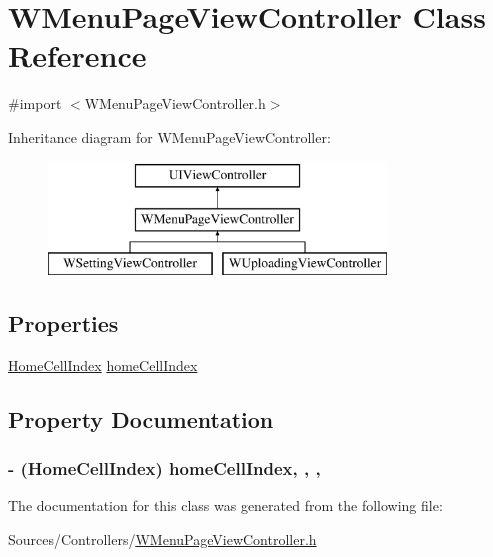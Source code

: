 \hypertarget{interface_w_menu_page_view_controller}{\section{W\-Menu\-Page\-View\-Controller Class Reference}
\label{interface_w_menu_page_view_controller}
}


{\ttfamily \#import $<$W\-Menu\-Page\-View\-Controller.\-h$>$}

Inheritance diagram for W\-Menu\-Page\-View\-Controller\-:\begin{figure}[H]
\begin{center}
\leavevmode
\includegraphics[height=3.000000cm]{interface_w_menu_page_view_controller}
\end{center}
\end{figure}
\subsection*{Properties}
\begin{DoxyCompactItemize}
\item 
\hyperlink{_w_home_view_controller_8h_af693adb781d3a9619a4217eaf2ec3905}{Home\-Cell\-Index} \hyperlink{interface_w_menu_page_view_controller_a00f0413f12d7efa190c920d4eb8cafc0}{home\-Cell\-Index}
\end{DoxyCompactItemize}


\subsection{Property Documentation}
\hypertarget{interface_w_menu_page_view_controller_a00f0413f12d7efa190c920d4eb8cafc0}{
\subsubsection[{home\-Cell\-Index}]{\setlength{\rightskip}{0pt plus 5cm}-\/ ({\bf Home\-Cell\-Index}) home\-Cell\-Index\hspace{0.3cm}{\ttfamily [read]}, {\ttfamily [write]}, {\ttfamily [atomic]}, {\ttfamily [assign]}}}\label{interface_w_menu_page_view_controller_a00f0413f12d7efa190c920d4eb8cafc0}


The documentation for this class was generated from the following file\-:\begin{DoxyCompactItemize}
\item 
Sources/\-Controllers/\hyperlink{_w_menu_page_view_controller_8h}{W\-Menu\-Page\-View\-Controller.\-h}\end{DoxyCompactItemize}

